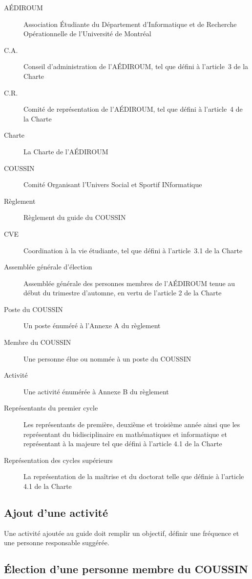 \documentclass{aediroum}
\begin{document}
\begin{description}
    \item[AÉDIROUM] Association Étudiante du Département d'Informatique et de Recherche Opérationnelle de l'Université de Montréal
    \item[C.A.] Conseil d’administration de l’AÉDIROUM, tel que défini à l’article~3 de la Charte
    \item[C.R.] Comité de représentation de l'AÉDIROUM, tel que défini à l'article~4 de la Charte
    \item[Charte] La Charte de l'AÉDIROUM
    \item[COUSSIN] Comité Organisant l'Univers Social et Sportif INformatique
    \item[Règlement] Règlement du guide du COUSSIN
    \item[CVE] Coordination à la vie étudiante, tel que défini à l'article~3.1 de la Charte
    \item[Assemblée générale d'élection] Assemblée générale des personnes membres de l'AÉDIROUM tenue au début du trimestre d'automne, en vertu de l'article 2 de la Charte
    \item[Poste du COUSSIN] Un poste énuméré à l'Annexe A du règlement
    \item[Membre du COUSSIN] Une personne élue ou nommée à un poste du COUSSIN
    \item[Activité] Une activité énumérée à Annexe B du règlement
    \item[Représentants du premier cycle] Les représentants de première, deuxième et troisième année ainsi que les représentant du bidisciplinaire en mathématiques et informatique et représentant à la majeure tel que défini à l'article 4.1 de la Charte
    \item[Représentation des cycles supérieurs] La représentation de la maîtrise et du doctorat telle que définie à l'article 4.1 de la Charte
\end{description}

\subsection{Ajout d'une activité}\label{sec:ajout-activite}

Une activité ajoutée au guide doit remplir un objectif, définir une fréquence et une personne responsable suggérée.

\subsection{Élection d'une personne membre du COUSSIN}\label{sec:election-coussin}
\end{document}
